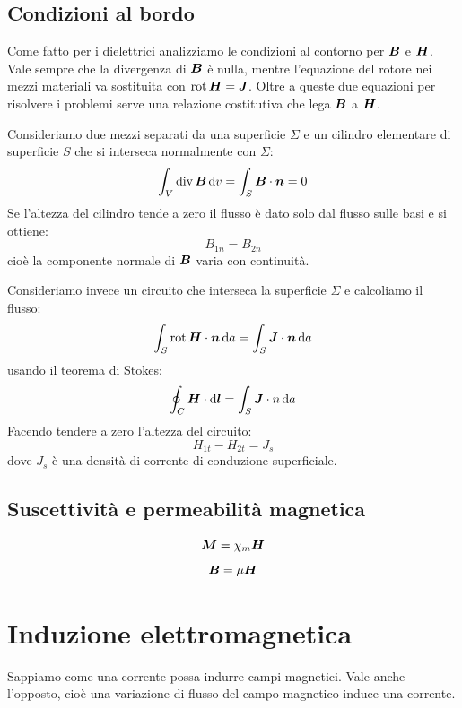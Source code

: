 \section{Condizioni al bordo}
Come fatto per i dielettrici analizziamo le condizioni al contorno per $\boldsymbol{B}$ e $\boldsymbol{H}$. Vale sempre che la divergenza di $\boldsymbol{B}$ è nulla, mentre l'equazione del rotore nei mezzi materiali va sostituita con $\operatorname{rot}\boldsymbol{H}=\boldsymbol{J}$. Oltre a queste due equazioni per risolvere i problemi serve una relazione costitutiva che lega $\boldsymbol{B}$ a $\boldsymbol{H}$.

Consideriamo due mezzi separati da una superficie $\Sigma$ e un cilindro elementare di superficie $S$ che si interseca normalmente con $\Sigma$:
\begin{equation}
  \int_V \operatorname{div} \boldsymbol{B}\,\mathrm{d} v = \int_S\boldsymbol{B}\cdot\boldsymbol{n} = 0
\end{equation}
Se l'altezza del cilindro tende a zero il flusso è dato solo dal flusso sulle basi e si ottiene:
\begin{equation}
  B_{1n}=B_{2n}
\end{equation}
cioè la componente normale di $\boldsymbol{B}$ varia con continuità.

Consideriamo invece un circuito che interseca la superficie $\Sigma$ e calcoliamo il flusso:
\begin{equation}
  \int_S\operatorname{rot}\boldsymbol{H}\cdot\boldsymbol{n}\,\mathrm{d} a=\int_S\boldsymbol{J}\cdot\boldsymbol{n}\,\mathrm{d} a
\end{equation}
usando il teorema di Stokes:
\begin{equation}
  \oint_C\boldsymbol{H}\cdot\mathrm{d}\boldsymbol{l}=\int_S\boldsymbol{J}\cdot n\,\mathrm{d} a
\end{equation}
Facendo tendere a zero l'altezza del circuito:
\begin{equation}
  H_{1t}-H_{2t}=J_s
\end{equation}
dove $J_s$ è una densità di corrente di conduzione superficiale.

\section{Suscettività e permeabilità magnetica}
\begin{equation}
  \boldsymbol{M} = \chi_m\boldsymbol{H}
\end{equation}
\begin{equation}
  \boldsymbol{B} = \mu\boldsymbol{H}
\end{equation}




\chapter{Induzione elettromagnetica}
\minitoc
Sappiamo come una corrente possa indurre campi magnetici. Vale anche l'opposto, cioè una variazione di flusso del campo magnetico induce una corrente.

